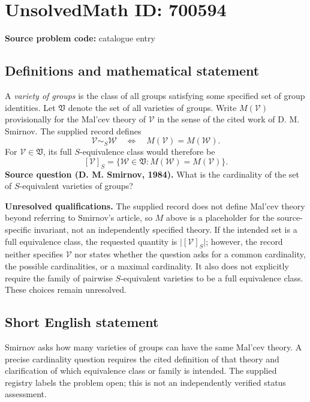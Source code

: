 \documentclass[11pt]{article}
\begin{document}
\section*{UnsolvedMath ID: 700594}
\textbf{Source problem code:} catalogue entry
\subsection{Definitions and mathematical statement}
A \emph{variety of groups} is the class of all groups satisfying some specified set of group identities. Let \(\mathfrak V\) denote the set of all varieties of groups. Write \(M(\mathcal V)\) provisionally for the Mal'cev theory of \(\mathcal V\) in the sense of the cited work of D. M. Smirnov. The supplied record defines
\[
\mathcal V\sim_S\mathcal W
\quad\Longleftrightarrow\quad
M(\mathcal V)=M(\mathcal W).
\]
For \(\mathcal V\in\mathfrak V\), its full \(S\)-equivalence class would therefore be
\[
[\mathcal V]_S
=\{\mathcal W\in\mathfrak V:M(\mathcal W)=M(\mathcal V)\}.
\]
\textbf{Source question (D. M. Smirnov, 1984).} What is the cardinality of the set of \(S\)-equivalent varieties of groups?

\textbf{Unresolved qualifications.} The supplied record does not define Mal'cev theory beyond referring to Smirnov's article, so \(M\) above is a placeholder for the source-specific invariant, not an independently specified theory. If the intended set is a full equivalence class, the requested quantity is \(\lvert[\mathcal V]_S\rvert\); however, the record neither specifies \(\mathcal V\) nor states whether the question asks for a common cardinality, the possible cardinalities, or a maximal cardinality. It also does not explicitly require the family of pairwise \(S\)-equivalent varieties to be a full equivalence class. These choices remain unresolved.
\subsection{Short English statement}
Smirnov asks how many varieties of groups can have the same Mal'cev theory. A precise cardinality question requires the cited definition of that theory and clarification of which equivalence class or family is intended. The supplied registry labels the problem open; this is not an independently verified status assessment.
\end{document}
